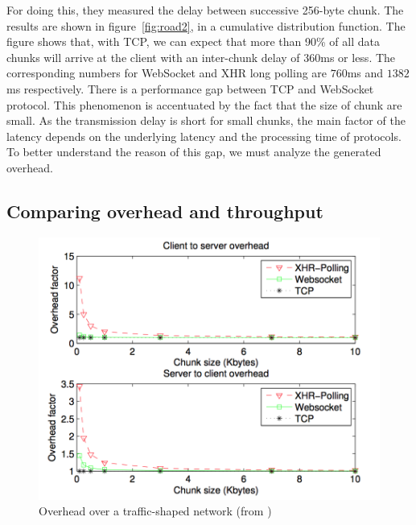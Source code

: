 \documentclass[10pt,journal,compsoc]{IEEEtran}
\newcommand{\ws}{WebSocket}
\begin{document}
For doing this, they measured the delay between successive 256-byte chunk. 
The results are shown in figure~\ref{fig:road2}, in a cumulative distribution function.
The figure shows that, with TCP, we can expect that more than 90\% of all data chunks will arrive at the client with an inter-chunk delay of 360ms or less. The corresponding numbers for \ws{} and XHR long polling are $760$ms and $1382$ms respectively.
There is a performance gap between TCP and \ws{} protocol.
This phenomenon is accentuated by the fact that the size of chunk are small.
As the transmission delay is short for small chunks, the main factor of the latency depends on the underlying latency and the processing time of protocols.
To better understand the reason of this gap, we must analyze the generated overhead.

\subsection{Comparing overhead and throughput}

\begin{figure}[!ht]
    \centering
    \includegraphics[width=\linewidth]{road4.png}
    \caption{Overhead over a traffic-shaped network (from \cite{roadblock})}
    \label{fig:road4}
\end{figure}
\end{document}
